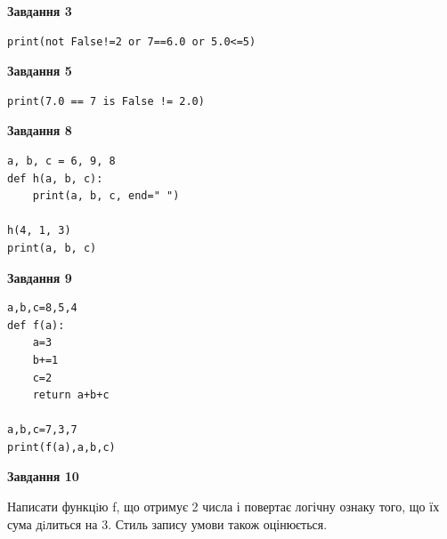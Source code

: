 \documentclass[12pt, ukrainian]{article}
\begin{document}
{\begin {large}
\begin{minipage}[t]{7.5cm}
\end{minipage}
\vline \hspace{6mm}
\begin{minipage}[t]{10.5cm}

\begin{center}
\textbf{Завдання 3}
\end{center}

\begin{verbatim}
print(not False!=2 or 7==6.0 or 5.0<=5)
\end{verbatim}



\begin{center}
\textbf{Завдання 5}
\end{center}

\begin{verbatim}
print(7.0 == 7 is False != 2.0)
\end{verbatim}



\begin{center}
\textbf{Завдання 8}
\end{center}

\begin{verbatim}
a, b, c = 6, 9, 8
def h(a, b, c):
    print(a, b, c, end=" ")

h(4, 1, 3)
print(a, b, c)
\end{verbatim}



\begin{center}
\textbf{Завдання 9}
\end{center}

\begin{verbatim}
a,b,c=8,5,4
def f(a):
    a=3
    b+=1
    c=2
    return a+b+c

a,b,c=7,3,7
print(f(a),a,b,c)
\end{verbatim}



\begin{center}
\textbf{Завдання 10}
\end{center}

Написати функцiю f, що отримує 2 числа і повертає логічну ознаку того, що їх сума дiлиться на 3. Стиль запису умови також оцінюється.\par

\end{minipage}

\end {large}}
\newpage
\end{document}

